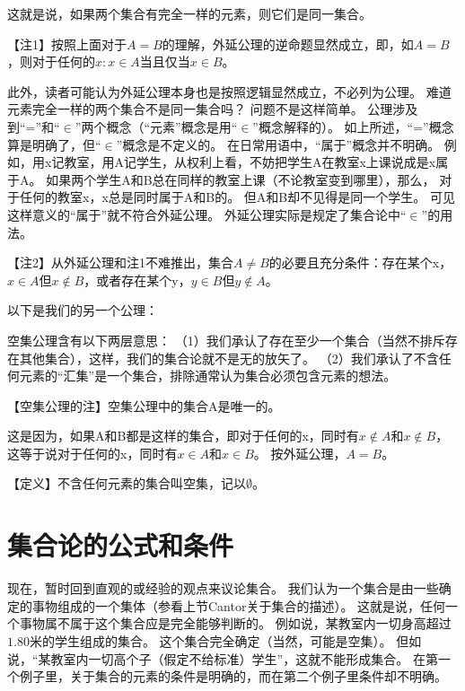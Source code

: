 
这就是说，如果两个集合有完全一样的元素，则它们是同一集合。

【注1】按照上面对于$A=B$的理解，外延公理的逆命题显然成立，即，如$A=B$，则对于任何的$x: x \in A$当且仅当$x \in B$。

此外，读者可能认为外延公理本身也是按照逻辑显然成立，不必列为公理。
难道元素完全一样的两个集合不是同一集合吗？
问题不是这样简单。
公理涉及到“=”和“$\in$”两个概念（“元素”概念是用“$\in$”概念解释的）。
如上所述，“=”概念算是明确了，但“$\in$”概念是不定义的。
在日常用语中，“属于”概念并不明确。
例如，用x记教室，用A记学生，从权利上看，不妨把学生A在教室x上课说成是x属于A。
如果两个学生A和B总在同样的教室上课（不论教室变到哪里），那么， 对于任何的教室x，x总是同时属于A和B的。
但A和B却不见得是同一个学生。
可见这样意义的“属于”就不符合外延公理。
外延公理实际是规定了集合论中“$\in$”的用法。

【注2】从外延公理和注1不难推出，集合$A \neq B$的必要且充分条件：存在某个x，$x \in A$但$x \notin B$，或者存在某个y，$y \in B$但$y \notin A$。

以下是我们的另一个公理：


空集公理含有以下两层意思：
（1）我们承认了存在至少一个集合（当然不排斥存在其他集合），这样，我们的集合论就不是无的放矢了。
（2）我们承认了不含任何元素的“汇集”是一个集合，排除通常认为集合必须包含元素的想法。

【空集公理的注】空集公理中的集合A是唯一的。

这是因为，如果A和B都是这样的集合，即对于任何的x，同时有$x \notin A$和$x \notin B$，这等于说对于任何的x，同时有$x \in A$和$x \in B$。
按外延公理，$A=B$。

【定义】不含任何元素的集合叫空集，记以$\emptyset$。

\section{集合论的公式和条件}

现在，暂时回到直观的或经验的观点来议论集合。
我们认为一个集合是由一些确定的事物组成的一个集体（参看上节Cantor关于集合的描述）。
这就是说，任何一个事物属不属于这个集合应是完全能够判断的。
例如说，某教室内一切身高超过$1.80$米的学生组成的集合。
这个集合完全确定（当然，可能是空集）。
但如说，“某教室内一切高个子（假定不给标准）学生”，这就不能形成集合。
在第一个例子里，关于集合的元素的条件是明确的，而在第二个例子里条件却不明确。

